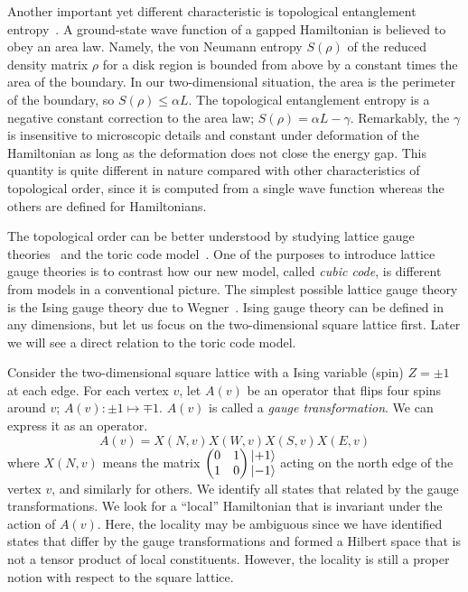 Another important yet different characteristic is topological entanglement entropy~\cite{KitaevPreskill2006Topological, LevinWen2006Detecting}. A ground-state wave function of a gapped Hamiltonian is believed to obey an area law. Namely, the von Neumann entropy $S(\rho)$ of the reduced density matrix $\rho$ for a disk region is bounded from above by a constant times the area of the boundary. In our two-dimensional situation, the area is the perimeter of the boundary, so $S(\rho) \le \alpha L$. The topological entanglement entropy is a negative constant correction to the area law; $S(\rho) = \alpha L -\gamma$. Remarkably, the $\gamma$ is insensitive to microscopic details and constant under deformation of the Hamiltonian as long as the deformation does not close the energy gap. This quantity is quite different in nature compared with other characteristics of topological order, since it is computed from a single wave function whereas the others are defined for Hamiltonians.

The topological order can be better understood by studying lattice gauge theories~\cite{Kogut1979LGT} and the toric code model~\cite{Kitaev2003Fault-tolerant}. One of the purposes to introduce lattice gauge theories is to contrast how our new model, called {\em cubic code}, is different from models in a conventional picture. The simplest possible lattice gauge theory is the Ising gauge theory due to Wegner~\cite{Wegner1971IsingGauge}. Ising gauge theory can be defined in any dimensions, but let us focus on the two-dimensional square lattice first. Later we will see a direct relation to the toric code model.


Consider the two-dimensional square lattice with a Ising variable (spin) $Z = \pm 1$ at each edge. For each vertex $v$, let $A(v)$ be an operator that flips four spins around $v$; $A(v) : \pm 1 \mapsto \mp 1$. $A(v)$ is called a {\em gauge transformation}. We can express it as an operator.
\[
 A(v) = X(N,v) X(W,v) X(S,v) X(E,v)
\]
where $X(N,v)$ means the matrix $\begin{pmatrix} 0 & 1 \\ 1 & 0 \end{pmatrix} \begin{matrix} \left| {+1} \right\rangle \\ \left| {-1} \right\rangle \end{matrix}$ 
acting on the north edge of the vertex $v$, and similarly for others.
We identify all states that related by the gauge transformations.
We look for a ``local'' Hamiltonian that is invariant under the action of $A(v)$.
Here, the locality may be ambiguous since we have identified states that differ by the gauge transformations
and formed a Hilbert space that is not a tensor product of local constituents.
However, the locality is still a proper notion with respect to the square lattice.


